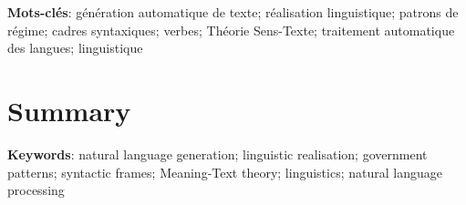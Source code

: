 \textbf{Mots-clés}: génération automatique de texte; réalisation linguistique; patrons de régime; cadres syntaxiques; verbes; Théorie Sens-Texte; traitement automatique des langues; linguistique

\chapter*{Summary}



\textbf{Keywords}: natural language generation; linguistic realisation; government patterns; syntactic frames; Meaning-Text theory; linguistics; natural language processing
